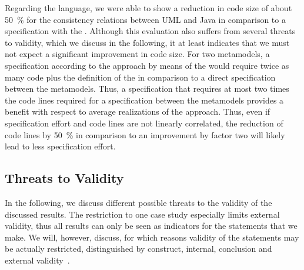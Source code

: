 Regarding the \commonalities language, we were able to show a reduction in code size of about \SI{50}{\percent} for the consistency relations between \gls{UML} and Java in comparison to a specification with the \reactionslanguage.
Although this evaluation also suffers from several threats to validity, which we discuss in the following, it at least indicates that we must not expect a significant improvement in code size.
For two metamodels, a specification according to the \commonalities approach by means of the \reactionslanguage would require twice as many \reactions code plus the definition of the \conceptmetamodel in comparison to a direct \reactions specification between the metamodels.
Thus, a specification that requires at most two times the code lines required for a \reactions specification between the metamodels provides a benefit with respect to average realizations of the \commonalities approach.
Thus, even if specification effort and code lines are not linearly correlated, the reduction of code lines by \SI{50}{\percent} in comparison to an improvement by factor two will likely lead to less specification effort.


\subsection*{Threats to Validity}

In the following, we discuss different possible threats to the validity of the discussed results.
The restriction to one case study especially limits external validity, thus all results can only be seen as indicators for the statements that we make.
We will, however, discuss, for which reasons validity of the statements may be actually restricted, distinguished by construct, internal, conclusion and external validity~\cite{wohlin2012validity-Book}.

